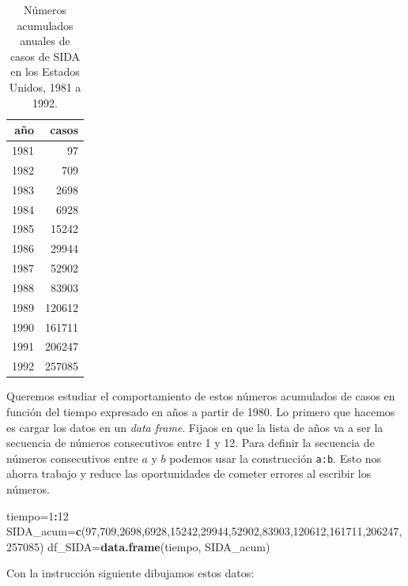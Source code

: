\documentclass[
]{book}
\newenvironment{Shaded}{\begin{snugshade}}{\end{snugshade}}
\newcommand{\DecValTok}[1]{\textcolor[rgb]{0.00,0.00,0.81}{#1}}
\newcommand{\KeywordTok}[1]{\textcolor[rgb]{0.13,0.29,0.53}{\textbf{#1}}}
\newcommand{\NormalTok}[1]{#1}
\newcommand{\OperatorTok}[1]{\textcolor[rgb]{0.81,0.36,0.00}{\textbf{#1}}}
\theoremstyle{definition}
\theoremstyle{definition}
\theoremstyle{definition}
\theoremstyle{remark}
\begin{document}
\begin{table}

\caption{\label{tab:sida}Números acumulados anuales de casos de SIDA en los Estados Unidos, 1981 a 1992.}
\centering
\begin{tabular}[t]{r|r}
\hline
año & casos\\
\hline
1981 & 97\\
\hline
1982 & 709\\
\hline
1983 & 2698\\
\hline
1984 & 6928\\
\hline
1985 & 15242\\
\hline
1986 & 29944\\
\hline
1987 & 52902\\
\hline
1988 & 83903\\
\hline
1989 & 120612\\
\hline
1990 & 161711\\
\hline
1991 & 206247\\
\hline
1992 & 257085\\
\hline
\end{tabular}
\end{table}

Queremos estudiar el comportamiento de estos números acumulados de casos en función del tiempo expresado en años a partir de 1980. Lo primero que hacemos es cargar los datos en un \emph{data frame}. Fijaos en que la lista de años va a ser la secuencia de números consecutivos entre 1 y 12. Para definir la secuencia de números consecutivos entre \(a\) y \(b\) podemos usar la construcción \texttt{a:b}. Esto nos ahorra trabajo y reduce las oportunidades de cometer errores al escribir los números.

\begin{Shaded}
\begin{Highlighting}[]
\NormalTok{tiempo=}\DecValTok{1}\OperatorTok{:}\DecValTok{12}
\NormalTok{SIDA\_acum=}\KeywordTok{c}\NormalTok{(}\DecValTok{97}\NormalTok{,}\DecValTok{709}\NormalTok{,}\DecValTok{2698}\NormalTok{,}\DecValTok{6928}\NormalTok{,}\DecValTok{15242}\NormalTok{,}\DecValTok{29944}\NormalTok{,}\DecValTok{52902}\NormalTok{,}\DecValTok{83903}\NormalTok{,}\DecValTok{120612}\NormalTok{,}\DecValTok{161711}\NormalTok{,}\DecValTok{206247}\NormalTok{,}\DecValTok{257085}\NormalTok{)}
\NormalTok{df\_SIDA=}\KeywordTok{data.frame}\NormalTok{(tiempo, SIDA\_acum)}
\end{Highlighting}
\end{Shaded}

Con la instrucción siguiente dibujamos estos datos:
\end{document}
